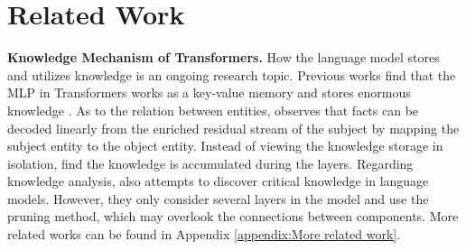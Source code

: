 \documentclass{article}
\begin{document}






















\section{Related Work}

\textbf{Knowledge Mechanism of Transformers.}
How the language model stores and utilizes knowledge is an ongoing research topic.
Previous works find that the MLP in Transformers works as a key-value memory and stores enormous knowledge \cite{dai-etal-2022-knowledge,geva-etal-2021-transformer,geva-etal-2022-transformer,meng2022locating}.
As to the relation between entities, \citet{hernandez2024linearity} observes that facts can be decoded linearly from the enriched residual stream of the subject by mapping the subject entity to the object entity.
Instead of viewing the knowledge storage in isolation, \citet{geva-etal-2023-dissecting,lv2024interpreting,yu2024locating} find the knowledge is accumulated during the layers. 
Regarding knowledge analysis, \citet{bayazit2023discovering} also attempts to discover critical knowledge in language models.
However, they only consider several layers in the model and use the pruning method, which may overlook the connections between components.
More related works can be found in Appendix \ref{appendix:More related work}.
\end{document}
